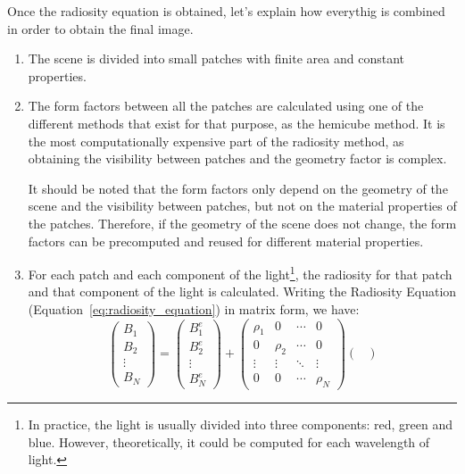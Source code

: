 Once the radiosity equation is obtained, let's explain how everythig is combined in order to obtain the final image.
\begin{enumerate}
    \item The scene is divided into small patches with finite area and constant properties.
    \item The form factors between all the patches are calculated using one of the different methods that exist for that purpose, as the hemicube method. It is the most computationally expensive part of the radiosity method, as obtaining the visibility between patches and the geometry factor is complex.
    
    It should be noted that the form factors only depend on the geometry of the scene and the visibility between patches, but not on the material properties of the patches. Therefore, if the geometry of the scene does not change, the form factors can be precomputed and reused for different material properties.
    \item For each patch and each component of the light\footnote{In practice, the light is usually divided into three components: red, green and blue. However, theoretically, it could be computed for each wavelength of light.}, the radiosity for that patch and that component of the light is calculated. Writing the Radiosity Equation (Equation~\ref{eq:radiosity_equation}) in matrix form, we have:
    \begin{equation*}
        \begin{pmatrix}
            B_1 \\
            B_2 \\
            \vdots \\
            B_N
        \end{pmatrix}
        = \begin{pmatrix}
            B_1^e \\
            B_2^e \\
            \vdots \\
            B_N^e
        \end{pmatrix}
        + \begin{pmatrix}
            \rho_1 & 0 & \cdots & 0 \\
            0 & \rho_2 & \cdots & 0 \\
            \vdots & \vdots & \ddots & \vdots \\
            0 & 0 & \cdots & \rho_N
        \end{pmatrix}
        \begin{pmatrix}

\end{pmatrix}
\end{equation*}
\end{enumerate}

